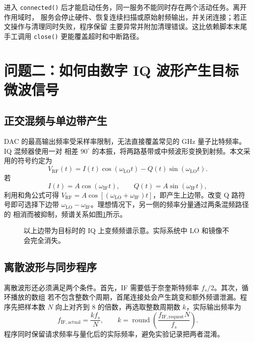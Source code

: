 \documentclass[UTF8,zihao=-4,a4paper]{ctexart}
\begin{document}
进入 \texttt{connected()} 后才能启动任务，同一服务不能同时存在两个活动任务。离开作用域时，
服务会停止硬件、恢复连续扫描或原始射频输出，并关闭连接；若正文操作与清理同时失败，程序保留
主要异常并附加清理错误。这比依赖脚本末尾手工调用 \texttt{close()} 更能覆盖超时和中断路径。

\section{问题二：如何由数字 IQ 波形产生目标微波信号}

\subsection{正交混频与单边带产生}

DAC 的最高输出频率受采样率限制，无法直接覆盖常见的 GHz 量子比特频率。IQ 混频器使用一对
相差 $90^\circ$ 的本振，将两路基带或中频波形变换到射频。本文采用的符号约定为
\begin{equation}
  V_{\mathrm{RF}}(t)=I(t)\cos(\omega_{\mathrm{LO}}t)
  -Q(t)\sin(\omega_{\mathrm{LO}}t).
  \label{eq:iq-mixer}
\end{equation}
若
\begin{equation}
  I(t)=A\cos(\omega_{\mathrm{IF}}t),\qquad
  Q(t)=A\sin(\omega_{\mathrm{IF}}t),
  \label{eq:iq-tone}
\end{equation}
利用和角公式可得 $V_{\mathrm{RF}}=A\cos[(\omega_{\mathrm{LO}}+
\omega_{\mathrm{IF}})t]$，即产生上边带。改变 Q 路符号即可选择下边带
$\omega_{\mathrm{LO}}-\omega_{\mathrm{IF}}$。理想情况下，另一侧的频率分量通过两条混频路径的
相消而被抑制\cite{analogdevices_iq}，频谱关系如图\ref{fig:iq-spectrum}所示。

\begin{figure}[htbp]
  \centering
  \resizebox{0.88\linewidth}{!}{}
  \caption{以上边带为目标时的 IQ 上变频频谱示意。实际系统中 LO 和镜像不会完全消失。}
  \label{fig:iq-spectrum}
\end{figure}

\subsection{离散波形与同步程序}

离散波形还必须满足两个条件。首先，IF 需要低于奈奎斯特频率 $f_s/2$。其次，循环播放的数组
若不包含整数个周期，首尾连接处会产生跳变和额外频谱泄漏。程序先把样本数 $N$ 向上对齐到
8 的倍数，再选取整数周期数 $k$，实际输出频率为
\begin{equation}
  f_{\mathrm{IF,actual}}=\frac{k f_s}{N},\qquad
  k=\operatorname{round}\!\left(\frac{f_{\mathrm{IF,request}}N}{f_s}\right).
  \label{eq:quantization}
\end{equation}
程序同时保留请求频率与量化后的实际频率，避免实验记录把两者混淆。
\end{document}
